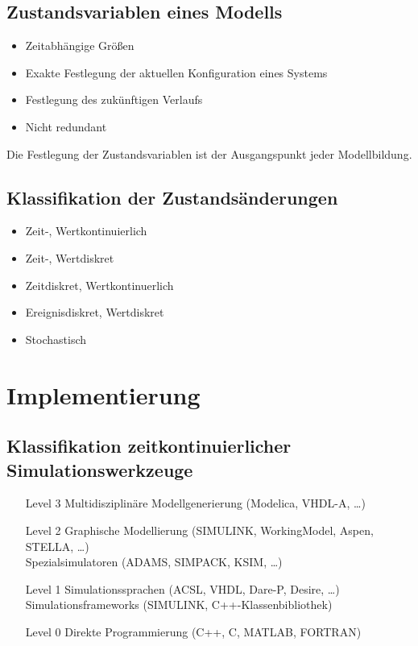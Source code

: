 
		\subsection{Zustandsvariablen eines Modells} %
			\begin{itemize}
				\item Zeitabhängige Größen
				\item Exakte Festlegung der aktuellen Konfiguration eines Systems
				\item Festlegung des zukünftigen Verlaufs
				\item Nicht redundant
			\end{itemize}
			Die Festlegung der Zustandsvariablen ist der Ausgangspunkt jeder Modellbildung.

		\subsection{Klassifikation der Zustandsänderungen} %
			\begin{itemize}
				\item Zeit-, Wertkontinuierlich
				\item Zeit-, Wertdiskret
				\item Zeitdiskret, Wertkontinuerlich
				\item Ereignisdiskret, Wertdiskret
				\item Stochastisch
			\end{itemize}


	\section{Implementierung} %
		\label{sec:simimpl}

		\subsection{Klassifikation zeitkontinuierlicher Simulationswerkzeuge} %
			\begin{itemize}
				\item[Level 3] Multidisziplinäre Modellgenerierung (Modelica, VHDL-A, \dots)
				\item[Level 2] Graphische Modellierung (SIMULINK, WorkingModel, Aspen, STELLA, \dots) \\
					Spezialsimulatoren (ADAMS, SIMPACK, KSIM, \dots)
				\item[Level 1] Simulationssprachen (ACSL, VHDL, Dare-P, Desire, \dots) \\
					Simulationsframeworks (SIMULINK, C++-Klassenbibliothek)
				\item[Level 0] Direkte Programmierung (C++, C, MATLAB, FORTRAN)
			\end{itemize}

